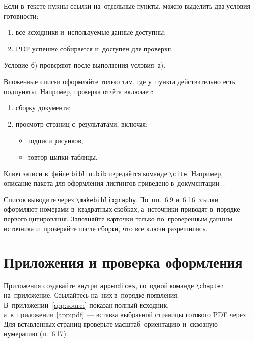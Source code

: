 \documentclass{bmstu}
\begin{document}
Если в~тексте нужны ссылки на~отдельные пункты, можно выделить два условия готовности:
\begin{enumerate}[label=\asbuk*),leftmargin=*]
    \item все исходники и~используемые данные доступны;
    \item PDF успешно собирается и~доступен для проверки.
\end{enumerate}

Условие~б) проверяют после выполнения условия~а).

\begin{samepage}
Вложенные списки оформляйте только там, где у~пункта действительно есть подпункты.
Например, проверка отчёта включает:
\begin{enumerate}
    \item сборку документа;
    \item просмотр страниц с~результатами, включая:
    \begin{itemize}
        \item подписи рисунков,
        \item повтор шапки таблицы.
    \end{itemize}
\end{enumerate}
\end{samepage}

Ключ записи в~файле \texttt{biblio.bib} передаётся команде \verb|\cite|.
Например, описание пакета для оформления листингов приведено в~документации~\cite{minted}.

Список выводите через \verb|\makebibliography|.
По~пп.~6.9 и~6.16 ссылки оформляют номерами в~квадратных скобках, а~источники приводят в~порядке первого цитирования.
Заполняйте карточки только по~проверенным данным источника и~проверяйте после сборки, что все ключи разрешились.

\section{Приложения и проверка оформления}

Приложения создавайте внутри \texttt{appendices}, по~одной команде \verb|\chapter| на~приложение.
Ссылайтесь на~них в~порядке появления.
В~приложении~\ref{app:source} показан полный исходник, а~в~приложении~\ref{app:pdf}~--- вставка выбранной страницы готового PDF через \verb||.
Для вставленных страниц проверьте масштаб, ориентацию и~сквозную нумерацию (п.~6.17).
\end{document}
